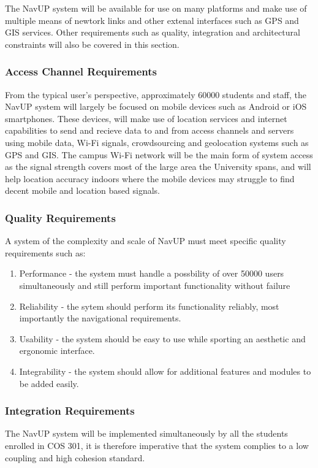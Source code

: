\documentclass[11pt,a4paper]{article}
\begin{document}
		The NavUP system will be available for use on many platforms and make use of multiple means of newtork links and other extenal interfaces such as GPS and GIS services.
		Other requirements such as quality, integration and architectural constraints will also be covered in this section.
		
			\subsubsection{Access Channel Requirements}
				From the typical user's perspective, approximately 60000 students and staff, the NavUP system will largely be focused on mobile devices such as Android or iOS smartphones.
				These devices, will make use of location services and internet capabilities to send and recieve data to and from access channels and servers using mobile data,
				Wi-Fi signals, crowdsourcing and geolocation systems such as GPS and GIS. The campus Wi-Fi network will be the main form of system access as the signal
				strength covers most of the large area the University spans, and will help location accuracy indoors where the mobile devices may struggle to find decent mobile
				and location based signals.
				
			\subsubsection{Quality Requirements}
				A system of the complexity and scale of NavUP must meet specific quality requirements such as:
				
				\begin{enumerate}
				\renewcommand{\labelenumi}{{\textbf{\arabic{enumi}.}}}
				\item Performance - the system must handle a possbility of over 50000 users simultaneously and still perform important functionality without failure
				\item Reliability - the sytem should perform its functionality reliably, most importantly the navigational requirements.
				\item Usability - the system should be easy to use while sporting an aesthetic and ergonomic interface.
				\item Integrability - the system should allow for additional features and modules to be added easily.
				\end{enumerate}
				
			\subsubsection{Integration Requirements}
				The NavUP system will be implemented simultaneously by all the students enrolled in COS 301, it is therefore imperative that the system complies to a low coupling and high cohesion standard.
\end{document}
